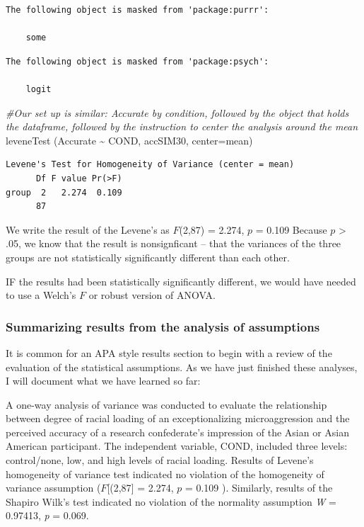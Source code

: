 \documentclass[
  english,
]{book}
\newenvironment{Shaded}{\begin{snugshade}}{\end{snugshade}}
\newcommand{\AttributeTok}[1]{\textcolor[rgb]{0.77,0.63,0.00}{#1}}
\newcommand{\CommentTok}[1]{\textcolor[rgb]{0.56,0.35,0.01}{\textit{#1}}}
\newcommand{\FunctionTok}[1]{\textcolor[rgb]{0.00,0.00,0.00}{#1}}
\newcommand{\NormalTok}[1]{#1}
\newcommand{\SpecialCharTok}[1]{\textcolor[rgb]{0.00,0.00,0.00}{#1}}
\begin{document}
\begin{verbatim}
The following object is masked from 'package:purrr':

    some
\end{verbatim}

\begin{verbatim}
The following object is masked from 'package:psych':

    logit
\end{verbatim}

\begin{Shaded}
\begin{Highlighting}[]
\CommentTok{\#Our set up is similar:  Accurate by condition, followed by the object that holds the dataframe, followed by the instruction to center the analysis around the mean}
\FunctionTok{leveneTest}\NormalTok{ (Accurate }\SpecialCharTok{\textasciitilde{}}\NormalTok{ COND, accSIM30, }\AttributeTok{center=}\NormalTok{mean)}
\end{Highlighting}
\end{Shaded}

\begin{verbatim}
Levene's Test for Homogeneity of Variance (center = mean)
      Df F value Pr(>F)
group  2   2.274  0.109
      87               
\end{verbatim}

We write the result of the Levene's as \(F\)(2,87) = 2.274, \(p\) = 0.109 Because \(p\) \textgreater{} .05, we know that the result is nonsignficant -- that the variances of the three groups are not statistically significantly different than each other.

IF the results had been statistically significantly different, we would have needed to use a Welch's \(F\) or robust version of ANOVA.

\hypertarget{summarizing-results-from-the-analysis-of-assumptions}{%
\subsubsection{Summarizing results from the analysis of assumptions}\label{summarizing-results-from-the-analysis-of-assumptions}}

It is common for an APA style results section to begin with a review of the evaluation of the statistical assumptions. As we have just finished these analyses, I will document what we have learned so far:

A one-way analysis of variance was conducted to evaluate the relationship between degree of racial loading of an exceptionalizing microaggression and the perceived accuracy of a research confederate's impression of the Asian or Asian American participant. The independent variable, COND, included three levels: control/none, low, and high levels of racial loading. Results of Levene's homogeneity of variance test indicated no violation of the homogeneity of variance assumption (\(F\){[}(2,87{]} = 2.274, \(p\) = 0.109 ). Similarly, results of the Shapiro Wilk's test indicated no violation of the normality assumption \emph{W} = 0.97413, \emph{p} = 0.069.
\end{document}

